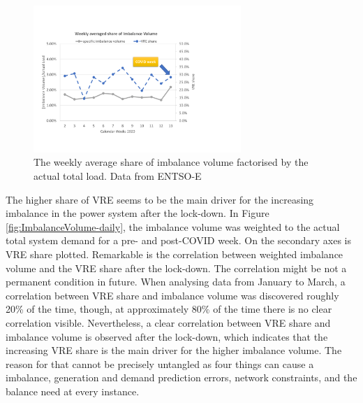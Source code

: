 \documentclass[energies,article,submit,moreauthors,pdftex]{Definitions/mdpi}
\begin{document}
\begin{figure}[H]
\centering
\hspace{-25pt}\includegraphics[trim={0cm 2cm 6.5cm 3.5cm},clip,width=0.7\textwidth]{Graphics/Illustration-Imbalance-2020.pdf}
\caption{The weekly average share of imbalance volume factorised by the actual total load. Data from ENTSO-E \protect\cite{ENTSO-E2020ENTSO-EPlatform}}
\label{fig:ImbalanceVolume_over_2020}
\end{figure} 

The higher share of VRE seems to be the main driver for the increasing imbalance in the power system after the lock-down. In Figure \ref{fig:ImbalanceVolume-daily}, the imbalance volume was weighted to the actual total system demand for a pre- and post-COVID week. On the secondary axes is VRE share plotted. Remarkable is the correlation between weighted imbalance volume and the VRE share after the lock-down. The correlation might be not a permanent condition in future. When analysing data from January to March, a correlation between VRE share and imbalance volume was discovered roughly 20\% of the time, though, at approximately 80\% of the time there is no clear correlation visible. Nevertheless, a clear correlation between VRE share and imbalance volume is observed after the lock-down, which indicates that the increasing VRE share is the main driver for the higher imbalance volume. The reason for that cannot be precisely untangled as four things can cause a imbalance, generation and demand prediction errors, network constraints, and the balance need at every instance. 
\end{document}
